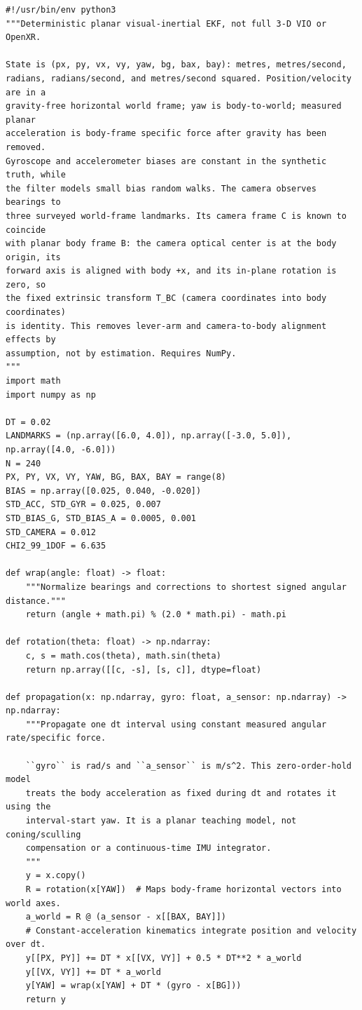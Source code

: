 \begin{verbatim}
#!/usr/bin/env python3
"""Deterministic planar visual-inertial EKF, not full 3-D VIO or OpenXR.

State is (px, py, vx, vy, yaw, bg, bax, bay): metres, metres/second,
radians, radians/second, and metres/second squared. Position/velocity are in a
gravity-free horizontal world frame; yaw is body-to-world; measured planar
acceleration is body-frame specific force after gravity has been removed.
Gyroscope and accelerometer biases are constant in the synthetic truth, while
the filter models small bias random walks. The camera observes bearings to
three surveyed world-frame landmarks. Its camera frame C is known to coincide
with planar body frame B: the camera optical center is at the body origin, its
forward axis is aligned with body +x, and its in-plane rotation is zero, so
the fixed extrinsic transform T_BC (camera coordinates into body coordinates)
is identity. This removes lever-arm and camera-to-body alignment effects by
assumption, not by estimation. Requires NumPy.
"""
import math
import numpy as np

DT = 0.02
LANDMARKS = (np.array([6.0, 4.0]), np.array([-3.0, 5.0]), np.array([4.0, -6.0]))
N = 240
PX, PY, VX, VY, YAW, BG, BAX, BAY = range(8)
BIAS = np.array([0.025, 0.040, -0.020])
STD_ACC, STD_GYR = 0.025, 0.007
STD_BIAS_G, STD_BIAS_A = 0.0005, 0.001
STD_CAMERA = 0.012
CHI2_99_1DOF = 6.635

def wrap(angle: float) -> float:
    """Normalize bearings and corrections to shortest signed angular distance."""
    return (angle + math.pi) % (2.0 * math.pi) - math.pi

def rotation(theta: float) -> np.ndarray:
    c, s = math.cos(theta), math.sin(theta)
    return np.array([[c, -s], [s, c]], dtype=float)

def propagation(x: np.ndarray, gyro: float, a_sensor: np.ndarray) -> np.ndarray:
    """Propagate one dt interval using constant measured angular rate/specific force.

    ``gyro`` is rad/s and ``a_sensor`` is m/s^2. This zero-order-hold model
    treats the body acceleration as fixed during dt and rotates it using the
    interval-start yaw. It is a planar teaching model, not coning/sculling
    compensation or a continuous-time IMU integrator.
    """
    y = x.copy()
    R = rotation(x[YAW])  # Maps body-frame horizontal vectors into world axes.
    a_world = R @ (a_sensor - x[[BAX, BAY]])
    # Constant-acceleration kinematics integrate position and velocity over dt.
    y[[PX, PY]] += DT * x[[VX, VY]] + 0.5 * DT**2 * a_world
    y[[VX, VY]] += DT * a_world
    y[YAW] = wrap(x[YAW] + DT * (gyro - x[BG]))
    return y


\end{verbatim}
